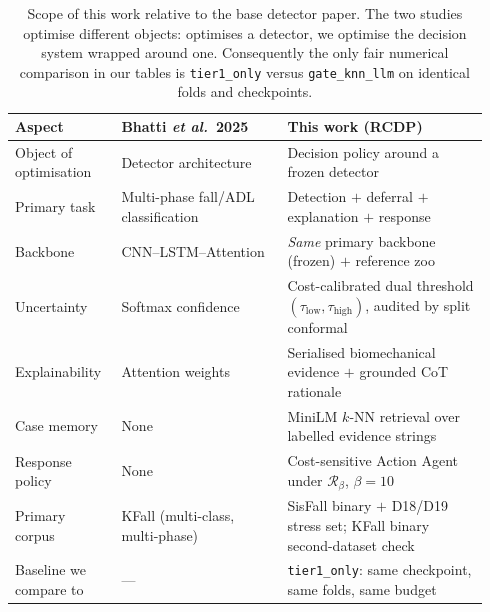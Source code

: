 \begin{table}[!t]
\centering
\caption{Scope of this work relative to the base detector paper. The two studies optimise different objects: \cite{bhatti2025beyond} optimises a detector, we optimise the decision system wrapped around one. Consequently the only fair numerical comparison in our tables is \texttt{tier1\_only} versus \texttt{gate\_knn\_llm} on identical folds and checkpoints.}
\label{tab:positioning}
\begin{tabular}{@{}p{0.215\linewidth} p{0.33\linewidth} p{0.40\linewidth}@{}}
\toprule
Aspect & Bhatti \textit{et al.}~2025~\cite{bhatti2025beyond} & This work (RCDP) \\
\midrule
Object of optimisation & Detector architecture & Decision policy around a frozen detector \\
Primary task & Multi-phase fall/ADL classification & Detection $+$ deferral $+$ explanation $+$ response \\
Backbone & CNN--LSTM--Attention & \emph{Same} primary backbone (frozen) $+$ reference zoo \\
Uncertainty & Softmax confidence & Cost-calibrated dual threshold $(\tau_{\mathrm{low}},\tau_{\mathrm{high}})$, audited by split conformal \\
Explainability & Attention weights & Serialised biomechanical evidence $+$ grounded CoT rationale \\
Case memory & None & MiniLM $k$-NN retrieval over labelled evidence strings \\
Response policy & None & Cost-sensitive Action Agent under $\mathcal{R}_\beta$, $\beta{=}10$ \\
Primary corpus & KFall (multi-class, multi-phase) & SisFall binary $+$ D18/D19 stress set; KFall binary second-dataset check \\
Baseline we compare to & --- & \texttt{tier1\_only}: same checkpoint, same folds, same budget \\
\bottomrule
\end{tabular}
\end{table}
